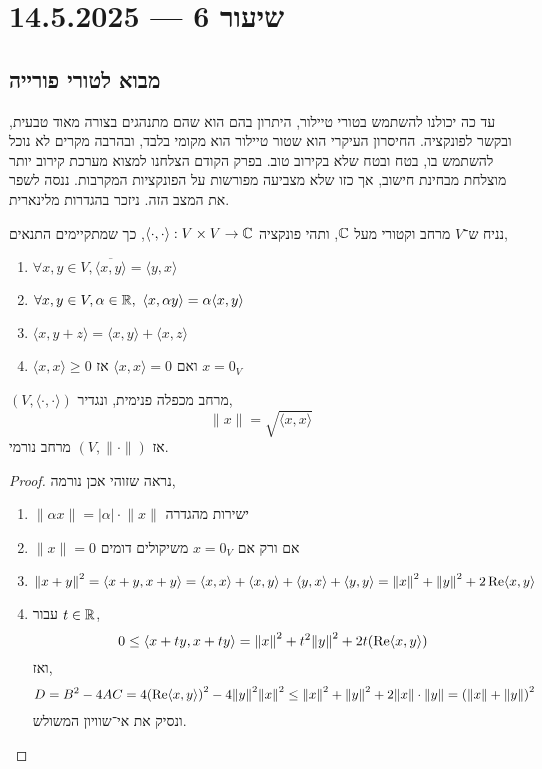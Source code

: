 \section{שיעור 6 --- 14.5.2025}
\subsection{מבוא לטורי פורייה}
עד כה יכולנו להשתמש בטורי טיילור, היתרון בהם הוא שהם מתנהגים בצורה מאוד טבעית, ובקשר לפונקציה.
החיסרון העיקרי הוא שטור טיילור הוא מקומי בלבד, ובהרבה מקרים לא נוכל להשתמש בו, בטח ובטח שלא בקירוב טוב.
בפרק הקודם הצלחנו למצוא מערכת קירוב יותר מוצלחת מבחינת חישוב, אך כזו שלא מצביעה מפורשות על הפונקציות המקרבות.
ננסה לשפר את המצב הזה.
ניזכר בהגדרות מלינארית.
\begin{definition}
	נניח ש־$V$ מרחב וקטורי מעל $\mathbb{C}$, ותהי פונקציה $\langle \cdot, \cdot \rangle : V \times V \to \mathbb{C}$,
	כך שמתקיימים התנאים,
	\begin{enumerate}
		\item $\forall x, y \in V, \overline{\langle x, y \rangle} = \langle y, x \rangle$
		\item $\forall x, y \in V, \alpha \in \RR,\ \langle x, \alpha y \rangle = \alpha \langle x, y \rangle$
		\item $\langle x, y + z \rangle = \langle x, y \rangle + \langle x, z \rangle$
		\item $\langle x, x \rangle \ge 0$ ואם $\langle x, x \rangle = 0$ אז $x = 0_V$
	\end{enumerate}
\end{definition}
\begin{theorem}
	$(V, \langle \cdot, \cdot \rangle)$ מרחב מכפלה פנימית,
	ונגדיר,
	\[
		\lVert x \rVert
		= \sqrt{\langle x, x \rangle}
	\]
	אז $(V, \lVert \cdot \rVert)$ מרחב נורמי.
\end{theorem}
\begin{proof}
	נראה שזוהי אכן נורמה,
	\begin{enumerate}
		\item $\lVert \alpha x \rVert = |\alpha| \cdot \lVert x \rVert$ ישירות מהגדרה
		\item $\lVert x \rVert = 0$ אם ורק אם $x = 0_V$ משיקולים דומים
		\item \[
				{\lVert x + y \rVert}^2 
				= \langle x + y, x + y \rangle 
				= \langle x, x \rangle + \langle x, y \rangle + \langle y, x \rangle + \langle y, y \rangle 
				= {\lVert x \rVert}^2 + {\lVert y \rVert}^2 + 2 \operatorname{Re} \langle x, y \rangle
			\]
		\item עבור $t \in \mathbb{R}$,
			\[
				0 \le \langle x + ty, x + ty \rangle
				= {\lVert x \rVert}^2 + t^2 {\lVert y \rVert}^2 + 2t (\operatorname{Re} \langle x, y \rangle)
			\]
			ואז,
			\[
				D 
				= B^2 - 4AC 
				= 4 {(\operatorname{Re} \langle x, y \rangle)}^2 - 4 {\lVert y \rVert}^2 {\lVert x \rVert}^2 \le {\lVert x \rVert}^2 + {\lVert y \rVert}^2 + 2 \lVert x \rVert \cdot \lVert y \rVert 
				= {(\lVert x \rVert + \lVert y \rVert)}^2
			\]
			ונסיק את אי־שוויון המשולש.
	\end{enumerate}
\end{proof}
